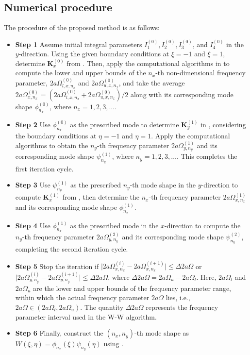\documentclass[preprint,12pt,number]{elsarticle}
\begin{document}
\subsection{Numerical procedure}\label{sec:Application procedure}
The procedure of the proposed method is as follows:   
\begin{itemize}[]
\item \textbf{Step 1} Assume initial integral parameters $I^{(0)}_1, I^{(0)}_2, I^{(0)}_3$, and $I^{(0)}_4$ in the $y$-direction. Using the given boundary conditions at $\xi = -1$ and $\xi = 1$, determine $\mathbf{K}^{(0)}_x$ from . 
Then, apply the computational algorithms in  to compute the lower and upper bounds of the $n_x$-th non-dimensional frequency parameter, $2a\Omega^{(0)}_{l,x,n_x}$ and $2a\Omega^{(0)}_{u,x,n_x}$, and take the average $2a\Omega^{(0)}_{x,n_x} = (2a\Omega^{(0)}_{l,x,n_x} + 2a\Omega^{(0)}_{u,x,n_x})/2$ along with its corresponding mode shape $\phi^{(0)}_{n_x}$, where $n_x = 1, 2, 3, \ldots$.

\item \textbf{Step 2} Use $\phi^{(0)}_{n_x}$ as the prescribed mode to determine $\mathbf{K}^{(1)}_y$ in , considering the boundary conditions at $\eta = -1$ and $\eta = 1$. 
Apply the computational algorithms to obtain the $n_y$-th frequency parameter $2a\Omega^{(1)}_{y,n_y}$ and its corresponding mode shape $\psi^{(1)}_{n_y}$, where $n_y = 1, 2, 3, \ldots$. This completes the first iteration cycle.  

\item \textbf{Step 3} Use $\psi^{(1)}_{n_y}$ as the prescribed $n_y$-th mode shape in the $y$-direction to compute $\mathbf{K}^{(1)}_x$ from , then determine the $n_x$-th frequency parameter $2a\Omega^{(1)}_{x,n_x}$ and its corresponding mode shape $\phi^{(1)}_{n_x}$.  

\item \textbf{Step 4} Use $\phi^{(1)}_{n_x}$ as the prescribed mode in the $x$-direction to compute the $n_y$-th frequency parameter $2a\Omega^{(2)}_{y,n_y}$ and its corresponding mode shape $\psi^{(2)}_{n_y}$, completing the second iteration cycle.  

\item \textbf{Step 5} Stop the iteration if $\lvert 2a\Omega^{(i)}_{x,n_x} - 2a\Omega^{(i+1)}_{x,n_x} \rvert \leq \Delta 2a\Omega$ or $\lvert 2a\Omega^{(i)}_{y,n_y} - 2a\Omega^{(i+1)}_{y,n_y} \rvert \leq \Delta 2a\Omega$, where $\Delta 2a\Omega = 2a\Omega_u - 2a\Omega_l$. Here, $2a\Omega_l$ and $2a\Omega_u$ are the lower and upper bounds of the frequency parameter range, within which the actual frequency parameter $2a\Omega$ lies, i.e., $2a\Omega \in (2a\Omega_l, 2a\Omega_u)$. The quantity $\Delta 2a\Omega$ represents the frequency parameter interval used in the W-W algorithm.

\item \textbf{Step 6} Finally, construct the $(n_x, n_y)$-th mode shape as $W(\xi, \eta) = \phi_{n_x}(\xi) \psi_{n_y}(\eta)$ using .  
\end{itemize}
\end{document}
